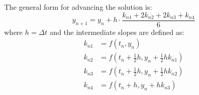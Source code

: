 \documentclass{article} %
\begin{document}
\begin{multicols}{2}
The general form for advancing the solution is:
\[
    y_{n+1} = y_{n} + h \cdot \frac{k_{n1} + 2k_{n2} + 2k_{n3} + k_{n4}}{6}
\]
where $h = \Delta t$ and the intermediate slopes are defined as:
\begin{align*}
    k_{n1} &= f(t_{n}, y_{n}) \\
    k_{n2} &= f\left(t_{n} + \frac{1}{2}h, y_{n} + \frac{1}{2}hk_{n1}\right) \\
    k_{n3} &= f\left(t_{n} + \frac{1}{2}h, y_{n} + \frac{1}{2}hk_{n2}\right) \\
    k_{n4} &= f(t_{n} + h, y_{n} + hk_{n3})
\end{align*}
\end{multicols}
\end{document}
